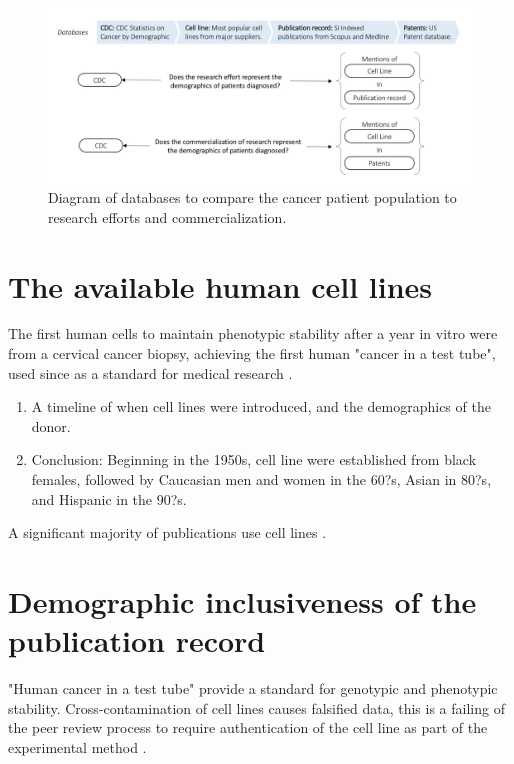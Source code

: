 \documentclass[11pt]{article}
\begin{document}
\begin{figure}[h!]
\centering
\includegraphics[width=0.98\columnwidth]{Databases.jpg}
\caption{\label{dist2} Diagram of databases to compare the cancer patient population to research efforts and commercialization. }
\end{figure}


\section{The available human cell lines}

 The first human cells to maintain phenotypic stability after a year in vitro were from a cervical cancer biopsy, achieving the first human "cancer in a test tube", used since as a standard for medical research \cite{gey1952tissue}.

\begin{enumerate}
\item A timeline of when cell lines were introduced, and the demographics of the donor.
\item Conclusion: Beginning in the 1950s, cell line were established from black females, followed by Caucasian men and women in the 60?s, Asian in 80?s, and Hispanic in the 90?s. 

\end{enumerate}
A significant majority of publications use cell lines \cite{arlett2001use}.
\section{Demographic inclusiveness of the publication record}


"Human cancer in a test tube" provide a standard for genotypic and phenotypic stability. Cross-contamination of cell lines causes falsified data, this is a failing of the peer review process to require authentication of the cell line as part of the experimental method  \cite{masters2002hela}. 

\cite{eid2012current}
\end{document}
